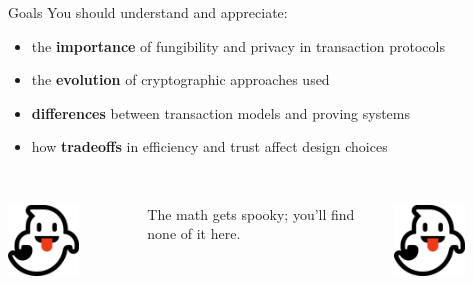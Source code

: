 \documentclass[aspectratio=169]{beamer}
\begin{document}
\begin{frame}{Goals}
You should understand and appreciate:
\begin{itemize}
\item the \textbf{importance} of fungibility and privacy in transaction protocols
\item the \textbf{evolution} of cryptographic approaches used
\item \textbf{differences} between transaction models and proving systems
\item how \textbf{tradeoffs} in efficiency and trust affect design choices \\~\\
\end{itemize}

\begin{columns}
\begin{column}{0.2\textwidth}
\centering
\includegraphics[width=0.6\textwidth]{icon-ghost.png}
\end{column}
\begin{column}{0.6\textwidth}
\centering
The math gets spooky; you'll find none of it here.
\end{column}
\begin{column}{0.2\textwidth}
\centering
\includegraphics[width=0.6\textwidth]{icon-ghost.png}
\end{column}
\end{columns}
\end{frame}
\end{document}
